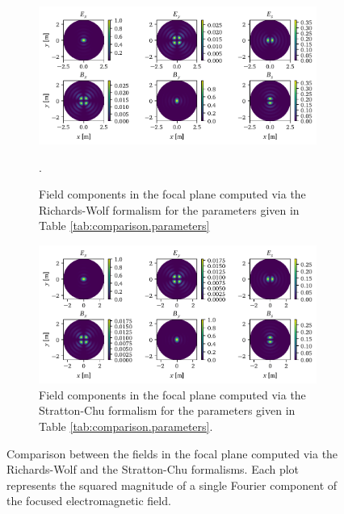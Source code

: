\documentclass[11pt,SymmetricalJury]{inrsthesis/inrsthesis}
\begin{document}
\begin{figure}
  \begin{subfigure}{\textwidth}
    \centering
    \includegraphics[width=\textwidth]{figs/RichardsWolf_fpNA1.pdf}
    \caption[Richards-Wolf field components for the HNA.LIN.G.NA1 case.]
            {Field components in the focal plane computed via the Richards-Wolf
            formalism for the parameters given in Table \ref{tab:comparison.parameters}}.
    \label{fig:sc.rw.hna-lin-g-na1}
  \end{subfigure}

  \begin{subfigure}{\textwidth}
    \centering
    \includegraphics[width=\textwidth]{figs/StrattonChu_fpNA1.pdf}
    \caption[Stratton-Chu field components for the HNA.LIN.G.NA1 case.]
            {Field components in the focal plane computed via the Stratton-Chu
            formalism for the parameters given in Table \ref{tab:comparison.parameters}.}
   \label{fig:sc.sc.hna-lin-g-na1}
  \end{subfigure}

\caption[Richards-Wolf vs Stratton-Chu: fields in the focal plane, HNA.LIN.G.NA1.]
        {Comparison between the fields in the focal plane computed via
        the Richards-Wolf and the Stratton-Chu formalisms. Each plot represents
        the squared magnitude of a single Fourier component of the focused
        electromagnetic field.}
\label{fig:sc.sc-vs-rw-hna-lin-g-na1}
\end{figure}
\end{document}
